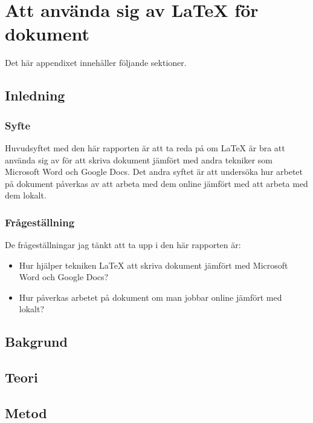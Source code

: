 \chapter{Att använda sig av LaTeX för dokument}
\label{cha:indiv-report-person}

Det här appendixet innehåller följande sektioner.

\section{Inledning}
\label{sec:introduction-tuhkala}


\subsection{Syfte}
\label{sec:purpose-tuhkala}
Huvudsyftet med den här rapporten är att ta reda på om LaTeX är bra att använda sig av för att skriva dokument jämfört med andra tekniker som Microsoft Word och Google Docs. Det andra syftet är att undersöka hur arbetet på dokument påverkas av att arbeta med dem online jämfört med att arbeta med dem lokalt.

\subsection{Frågeställning}
\label{sec:issue-tuhkala}
De frågeställningar jag tänkt att ta upp i den här rapporten är:

\begin{itemize}
	\item Hur hjälper tekniken LaTeX att skriva dokument jämfört med Microsoft Word och Google Docs?
	\item Hur påverkas arbetet på dokument om man jobbar online jämfört med lokalt?
\end{itemize}

\section{Bakgrund}
\label{sec:background-tuhkala}


\section{Teori}
\label{sec:theory-tuhkala}


\section{Metod}
\label{sec:method-tuhkala}

